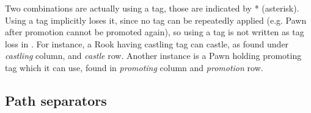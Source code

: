 Two combinations are actually using a tag, those are indicated by * (asterisk). Using a
tag implicitly loses it, since no tag can be repeatedly applied (e.g. Pawn after promotion
cannot be promoted again), so using a tag is not written as tag loss in . For
instance, a Rook having castling tag can castle, as found under \emph{castling} column,
and \emph{castle} row. Another instance is a Pawn holding promoting tag which it can use,
found in \emph{promoting} column and \emph{promotion} row.

\clearpage %

\subsection*{Path separators}
\label{sec:Appendix/Summary/Path separators}

